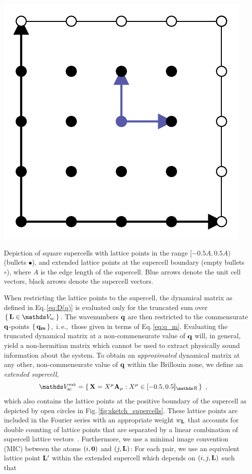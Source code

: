 \begin{marginfigure}[0cm]
	\includegraphics[width=.8\textwidth]{./data/sketches/4_sc.pdf}
	\caption{Depiction of square supercells with lattice points in the range $[-0.5 A, 0.5 A)$ (bullets $\bullet$), and extended lattice points at the supercell boundary (empty bullets $\circ$), where $A$ is the edge length of the supercell. Blue arrows denote the unit cell vectors, black arrows denote the supercell vectors.}
	\label{fig:sketch_supercells}
\end{marginfigure}
When restricting the lattice points to the supercell, the dynamical matrix as defined in Eq.\,\eqref{eq:D(q)} is evaluated only for the truncated sum over $\set{\b L \in \mathds V_{\rm sc}}$. The wavenumbers ${\bf q}$ are then restricted to the commensurate ${\bf q}$-points $\set{{\bf q}_{{\bf m}}}$,~i.\,e.,~those given in terms of Eq.\,\eqref{eq:q_m}. Evaluating the truncated dynamical matrix at a non-commensurate value of ${\bf q}$ will, in general, yield a non-hermitian matrix which cannot be used to extract physically sound information about the system. To obtain an \emph{approximated} dynamical matrix at any other, non-commensurate value of ${\bf q}$ within the Brillouin zone, we define an \emph{extended supercell}, 
\begin{align}
	\mathds V_{\rm sc}^{\rm ext}
		&= \set{{\bf X} = X^\mu {\bf A}_\mu : X^\mu \in {[-0.5, 0.5 \boldsymbol{]}_{\mathds R}}}~,
	\label{eq:supercell.extended}
\end{align}
which also contains the lattice points at the positive boundary of the supercell as depicted by open circles in Fig.\,\ref{fig:sketch_supercells}.
These lattice points are included in the Fourier series with an appropriate weight $w_{{\bf L}}$ that accounts for double counting of lattice points that are separated by a linear combination of supercell lattice vectors~\cite{Parlinski1997}. Furthermore, we use a minimal image convention (MIC) between the atoms $(i, {\bf 0})$ and $(j, {\bf L})$: For each pair, we use an equivalent lattice point ${\bf L}'$ within the extended supercell which depends on $(i, j, {\bf L})$ such that
